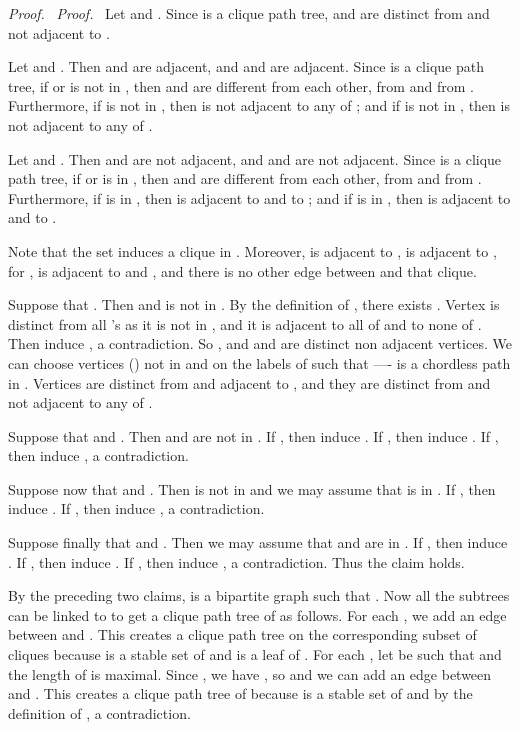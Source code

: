 \documentclass[11pt]{article}
\newenvironment{proof}{\noindent \emph{Proof.}\ }{\hfill
    \vspace{1em}}
\newenvironment{proofcl}{\noindent \emph{Proof.}\ }{Thus the claim
holds.  \hfill \vspace{1em}}
\begin{document}
\begin{proof}
\begin{proofcl}
Let  and .
Since  is a clique path tree,  and  are
distinct from  and not adjacent to .

Let  and .  Then  and
 are adjacent, and  and  are adjacent.  Since 
is a clique path tree, if  or  is not in , then  and
 are different from each other, from  and
from .  Furthermore, if  is not in ,
then  is not adjacent to any of ; and if 
is not in , then  is not adjacent to any of .

Let  and .  Then
 and  are not adjacent, and  and  are not
adjacent.  Since  is a clique path tree, if  or  is in
, then  and  are different from each other, from  and from .  Furthermore, if
 is in , then  is adjacent to  and to ; and if  is in , then  is adjacent to  and
to .

Note that the set 
induces a clique in .  Moreover,  is adjacent to , 
is adjacent to , for ,  is adjacent to
 and , and there is no other edge between  and that clique.

Suppose that .  Then  and  is not in .
By the definition of , there exists .
Vertex  is distinct from all 's as it is not in , and it
is adjacent to all of  and to none of .  Then  induce
, a contradiction.  So , and 
and  are distinct non adjacent vertices.  We can choose
vertices  () not in  and on the labels
of  such that ---- is a
chordless path in .  Vertices  are distinct from
and adjacent to , and they are distinct
from and not adjacent to any of .

Suppose that  and .  Then  and  are
not in .  If , then   induce .  If , then   induce
.  If , then  induce , a contradiction.

Suppose now that  and .  Then  is not
in  and we may assume that  is in .  If , then   induce
.  If , then  induce , a contradiction.

Suppose finally that  and .  Then we may
assume that  and  are in .  If , then  induce .  If , then  induce .  If , then
 induce
, a contradiction.
\end{proofcl}


By the preceding two claims,  is a bipartite graph  such that .  Now all the subtrees 
can be linked to  to get a clique path tree of  as follows.  For
each , we add an edge  between  and .  This
creates a clique path tree on the corresponding subset of cliques
because  is a stable set of  and  is a leaf of .
For each , let  be such that
 and the length of  is
maximal.  Since , we have , so
 and we can add an edge  between  and
.  This creates a clique path tree of  because  is a stable
set of  and by the definition of , a contradiction.
\end{proof}
\end{document}
